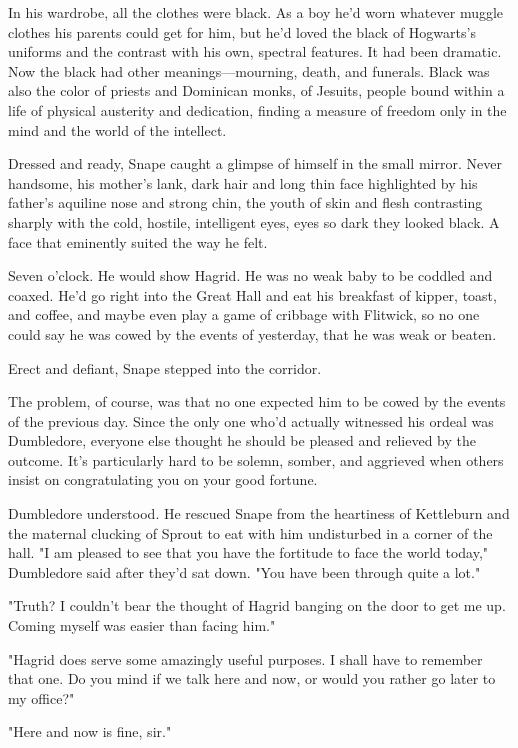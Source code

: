 In his wardrobe, all the clothes were black. As a boy he'd worn whatever muggle clothes his parents could get for him, but he'd loved the black of Hogwarts's uniforms and the contrast with his own, spectral features. It had been dramatic. Now the black had other meanings—mourning, death, and funerals. Black was also the color of priests and Dominican monks, of Jesuits, people bound within a life of physical austerity and dedication, finding a measure of freedom only in the mind and the world of the intellect.

Dressed and ready, Snape caught a glimpse of himself in the small mirror. Never handsome, his mother's lank, dark hair and long thin face highlighted by his father's aquiline nose and strong chin, the youth of skin and flesh contrasting sharply with the cold, hostile, intelligent eyes, eyes so dark they looked black. A face that eminently suited the way he felt.

Seven o'clock. He would show Hagrid. He was no weak baby to be coddled and coaxed. He'd go right into the Great Hall and eat his breakfast of kipper, toast, and coffee, and maybe even play a game of cribbage with Flitwick, so no one could say he was cowed by the events of yesterday, that he was weak or beaten.

Erect and defiant, Snape stepped into the corridor.

The problem, of course, was that no one expected him to be cowed by the events of the previous day. Since the only one who'd actually witnessed his ordeal was Dumbledore, everyone else thought he should be pleased and relieved by the outcome. It's particularly hard to be solemn, somber, and aggrieved when others insist on congratulating you on your good fortune.

Dumbledore understood. He rescued Snape from the heartiness of Kettleburn and the maternal clucking of Sprout to eat with him undisturbed in a corner of the hall. "I am pleased to see that you have the fortitude to face the world today," Dumbledore said after they'd sat down. "You have been through quite a lot."

"Truth? I couldn't bear the thought of Hagrid banging on the door to get me up. Coming myself was easier than facing him."

"Hagrid does serve some amazingly useful purposes. I shall have to remember that one. Do you mind if we talk here and now, or would you rather go later to my office?"

"Here and now is fine, sir."

